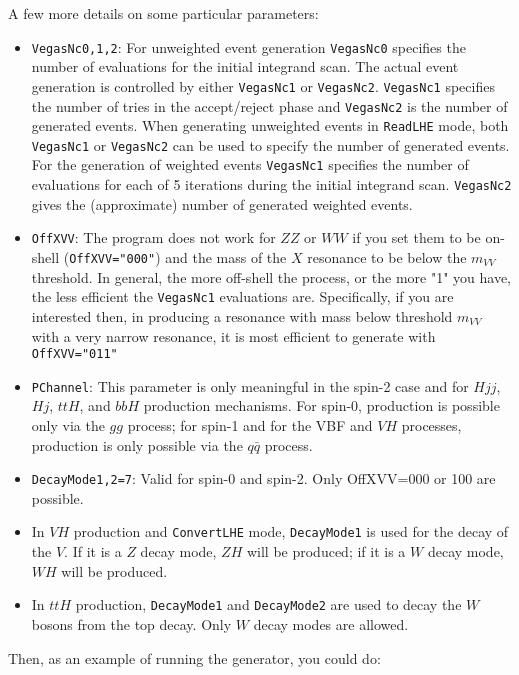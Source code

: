 \documentclass[aps,superscriptaddress,nofootinbib]{revtex4}
\begin{document}
\noindent
A few more details on some particular parameters:

\begin{itemize}
\item {\verb|VegasNc0,1,2|}: For unweighted event generation \verb|VegasNc0| specifies the number of evaluations for the initial integrand scan.  The actual event generation is controlled by either \verb|VegasNc1| or \verb|VegasNc2|. \verb|VegasNc1| specifies the number of tries in the accept/reject phase and \verb|VegasNc2| is the number of generated events. When generating unweighted events in \verb|ReadLHE| mode, both \verb|VegasNc1| or \verb|VegasNc2| can be used to specify the number of generated events. For the generation of weighted events \verb|VegasNc1| specifies the number of evaluations for each of 5 iterations during the initial integrand scan. \verb|VegasNc2| gives the (approximate) number of generated weighted events.
\item {\verb|OffXVV|}: The program does not work for $ZZ$ or $WW$ if you set them to be on-shell (\verb|OffXVV="000"|) and the mass of the $X$ resonance to be below the $m_{VV}$ threshold.  In general, the more off-shell the process, or the more "1" you have, the less efficient the \verb|VegasNc1| evaluations are.  Specifically, if you are interested then, in producing a resonance with mass below threshold $m_{VV}$ with a very narrow resonance, it is most efficient to generate with \verb|OffXVV="011"|
\item \verb|PChannel|: This parameter is only meaningful in the spin-2 case and for $Hjj$, $Hj$, $ttH$, and $bbH$ production mechanisms.  For spin-0, production is possible only via the $gg$ process; for spin-1 and for the VBF and $VH$ processes, production is only possible via the $q\bar{q}$ process.
\item \verb|DecayMode1,2=7|: Valid for spin-0 and spin-2.  Only OffXVV=000 or 100 are possible.
\item In $VH$ production and \verb|ConvertLHE| mode, \verb|DecayMode1| is used for the decay of the $V$.  If it is a $Z$ decay mode, $ZH$ will be produced; if it is a $W$ decay mode, $WH$ will be produced.
\item In $ttH$ production, \verb|DecayMode1| and \verb|DecayMode2| are used to decay the $W$ bosons from the top decay.  Only $W$ decay modes are allowed.
\end{itemize}

\noindent
Then, as an example of running the generator, you could do:
\end{document}
